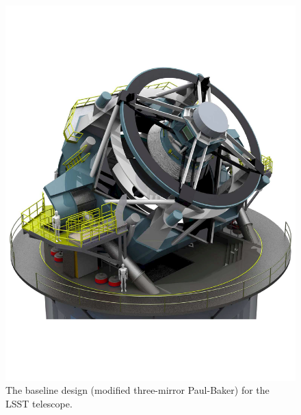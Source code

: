 \documentclass{emulateapj}
\begin{document}
\begin{figure}
\vskip -0.65in
\includegraphics[width=1.0\hsize,clip]{telescopeGreen.pdf}
\vskip -0.65in
\caption{The baseline design (modified three-mirror Paul-Baker) for the 
LSST telescope.} 
\label{Fig:telescope}
\end{figure}
\end{document}
